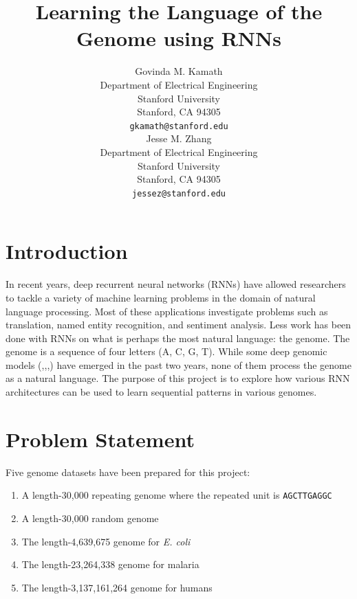 \documentclass{article} %
\title{Learning the Language of the Genome using RNNs}
\author{
Govinda M. Kamath \\
Department of Electrical Engineering\\
Stanford University\\
Stanford, CA 94305 \\
\texttt{gkamath@stanford.edu} \\
\And
Jesse M. Zhang \\
Department of Electrical Engineering \\
Stanford University \\
Stanford, CA 94305 \\
\texttt{jessez@stanford.edu} \\
}
\begin{document}
\maketitle


\section{Introduction}
In recent years, deep recurrent neural networks (RNNs) have allowed researchers to tackle a variety of machine learning problems in the domain of natural language processing. Most of these applications investigate problems such as translation, named entity recognition, and sentiment analysis. Less work has been done with RNNs on what is perhaps the most natural language: the genome. The genome is a sequence of four letters (A, C, G, T). While some deep genomic models (\cite{alipanahi2015predicting},\cite{kelley2015basset},\cite{quang2015danq},\cite{zhou2015predicting}) have emerged in the past two years, none of them process the genome as a natural language. The purpose of this project is to explore how various RNN architectures can be used to learn sequential patterns in various genomes. 

\section{Problem Statement}
Five genome datasets have been prepared for this project:
\begin{enumerate}
	\item A length-30,000 repeating genome where the repeated unit is \texttt{AGCTTGAGGC}
	\item A length-30,000 random genome
	\item The length-4,639,675 genome for \textit{E. coli}
	\item The length-23,264,338 genome for malaria
	\item The length-3,137,161,264 genome for humans 
\end{enumerate}
\end{document}
